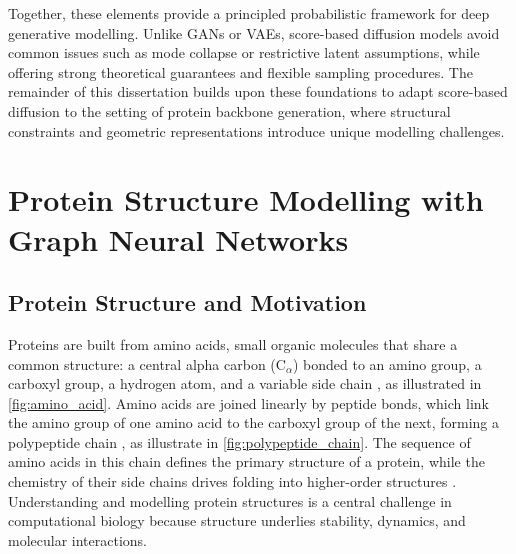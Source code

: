 \documentclass[a4paper,12pt]{article}
\begin{document}
Together, these elements provide a principled probabilistic framework for deep generative modelling. Unlike GANs or VAEs, score-based diffusion models avoid common issues such as mode collapse or restrictive latent assumptions, while offering strong theoretical guarantees and flexible sampling procedures. The remainder of this dissertation builds upon these foundations to adapt score-based diffusion to the setting of protein backbone generation, where structural constraints and geometric representations introduce unique modelling challenges.

\clearpage

\section{Protein Structure Modelling with Graph Neural Networks}\label{sec:protein-gnn}
\subsection{Protein Structure and Motivation}\label{subsec:protein-structure}
Proteins are built from amino acids, small organic molecules that share a common structure: a central alpha carbon (C\(_\alpha\)) bonded to an amino group, a carboxyl group, a hydrogen atom, and a variable side chain \citep{branden2012IntroductionProteinStructure}, as illustrated in \cref{fig:amino_acid}. Amino acids are joined linearly by peptide bonds, which link the amino group of one amino acid to the carboxyl group of the next, forming a polypeptide chain \citep{branden2012IntroductionProteinStructure}, as illustrate in \cref{fig:polypeptide_chain}. The sequence of amino acids in this chain defines the primary structure of a protein, while the chemistry of their side chains drives folding into higher-order structures \citep{creighton1993proteins,branden2012IntroductionProteinStructure}. Understanding and modelling protein structures is a central challenge in computational biology because structure underlies stability, dynamics, and molecular interactions.
\end{document}
